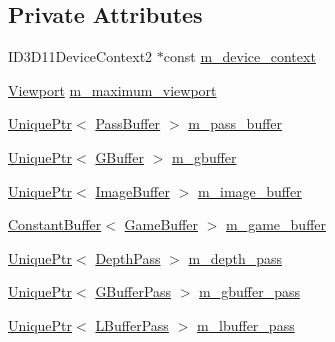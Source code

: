 \subsection*{Private Attributes}
\begin{DoxyCompactItemize}
\item 
I\+D3\+D11\+Device\+Context2 $\ast$const \hyperlink{classmage_1_1_scene_renderer_a163ff32807bea62e11fa06c5adf2a291}{m\+\_\+device\+\_\+context}
\item 
\hyperlink{structmage_1_1_viewport}{Viewport} \hyperlink{classmage_1_1_scene_renderer_aee59ce6095e555d2692dfbb6dbeec206}{m\+\_\+maximum\+\_\+viewport}
\item 
\hyperlink{namespacemage_a3316d7143a973e37adf1110f2e80ca31}{Unique\+Ptr}$<$ \hyperlink{structmage_1_1_pass_buffer}{Pass\+Buffer} $>$ \hyperlink{classmage_1_1_scene_renderer_a9801d415ee0113f9d2a53802df0cb7ba}{m\+\_\+pass\+\_\+buffer}
\item 
\hyperlink{namespacemage_a3316d7143a973e37adf1110f2e80ca31}{Unique\+Ptr}$<$ \hyperlink{structmage_1_1_g_buffer}{G\+Buffer} $>$ \hyperlink{classmage_1_1_scene_renderer_ad4a2b9abc762584bd9aceccb5f47b9c4}{m\+\_\+gbuffer}
\item 
\hyperlink{namespacemage_a3316d7143a973e37adf1110f2e80ca31}{Unique\+Ptr}$<$ \hyperlink{structmage_1_1_image_buffer}{Image\+Buffer} $>$ \hyperlink{classmage_1_1_scene_renderer_aa5a3894d626aa7fec7aa83033b0d01db}{m\+\_\+image\+\_\+buffer}
\item 
\hyperlink{structmage_1_1_constant_buffer}{Constant\+Buffer}$<$ \hyperlink{structmage_1_1_game_buffer}{Game\+Buffer} $>$ \hyperlink{classmage_1_1_scene_renderer_ad684a7211da48953a653fbb95f984fdd}{m\+\_\+game\+\_\+buffer}
\item 
\hyperlink{namespacemage_a3316d7143a973e37adf1110f2e80ca31}{Unique\+Ptr}$<$ \hyperlink{classmage_1_1_depth_pass}{Depth\+Pass} $>$ \hyperlink{classmage_1_1_scene_renderer_abdb26cf0c454d1e5a7fed949191c1044}{m\+\_\+depth\+\_\+pass}
\item 
\hyperlink{namespacemage_a3316d7143a973e37adf1110f2e80ca31}{Unique\+Ptr}$<$ \hyperlink{classmage_1_1_g_buffer_pass}{G\+Buffer\+Pass} $>$ \hyperlink{classmage_1_1_scene_renderer_a7892cf0b6e53a8d1a5cef1b81353d77a}{m\+\_\+gbuffer\+\_\+pass}
\item 
\hyperlink{namespacemage_a3316d7143a973e37adf1110f2e80ca31}{Unique\+Ptr}$<$ \hyperlink{structmage_1_1_l_buffer_pass}{L\+Buffer\+Pass} $>$ \hyperlink{classmage_1_1_scene_renderer_ad4e0f4d858ad1b56a2c948d74ae391eb}{m\+\_\+lbuffer\+\_\+pass}
\item 

\end{DoxyCompactItemize}
